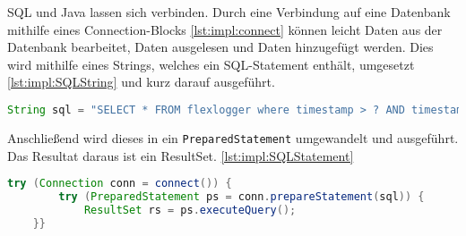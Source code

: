 SQL und Java lassen sich verbinden. Durch eine Verbindung auf eine Datenbank mithilfe eines Connection-Blocks \ref{lst:impl:connect} können leicht Daten aus der Datenbank bearbeitet, Daten ausgelesen und Daten hinzugefügt werden. Dies wird mithilfe eines Strings, welches ein SQL-Statement enthält, umgesetzt  \ref{lst:impl:SQLString} und kurz darauf ausgeführt. 

\begin{lstlisting}[language=java,caption=SQL-String,label=lst:impl:SQLString]
    String sql = "SELECT * FROM flexlogger where timestamp > ? AND timestamp < ? order by timestamp";
\end{lstlisting}

Anschließend wird dieses in ein \texttt{PreparedStatement} umgewandelt und ausgeführt. Das Resultat daraus ist ein ResultSet. \ref{lst:impl:SQLStatement}

\begin{lstlisting}[language=java,caption=SQL-Statement ausführen,label=lst:impl:SQLStatement]
    try (Connection conn = connect()) {
        try (PreparedStatement ps = conn.prepareStatement(sql)) {
            ResultSet rs = ps.executeQuery();
    }}
\end{lstlisting}
